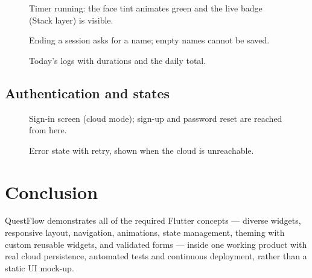 \documentclass[12pt,a4paper]{article}
\begin{document}
\begin{figure}[H]
  \centering
  \caption{Timer running: the face tint animates green and the live badge
  (Stack layer) is visible.}
\end{figure}

\begin{figure}[H]
  \centering
  \caption{Ending a session asks for a name; empty names cannot be saved.}
\end{figure}

\begin{figure}[H]
  \centering
  \caption{Today's logs with durations and the daily total.}
\end{figure}

\subsection{Authentication and states}

\begin{figure}[H]
  \centering
  \caption{Sign-in screen (cloud mode); sign-up and password reset are
  reached from here.}
\end{figure}

\begin{figure}[H]
  \centering
  \caption{Error state with retry, shown when the cloud is unreachable.}
\end{figure}

\section{Conclusion}

QuestFlow demonstrates all of the required Flutter concepts --- diverse
widgets, responsive layout, navigation, animations, state management,
theming with custom reusable widgets, and validated forms --- inside one
working product with real cloud persistence, automated tests and continuous
deployment, rather than a static UI mock-up.
\end{document}

